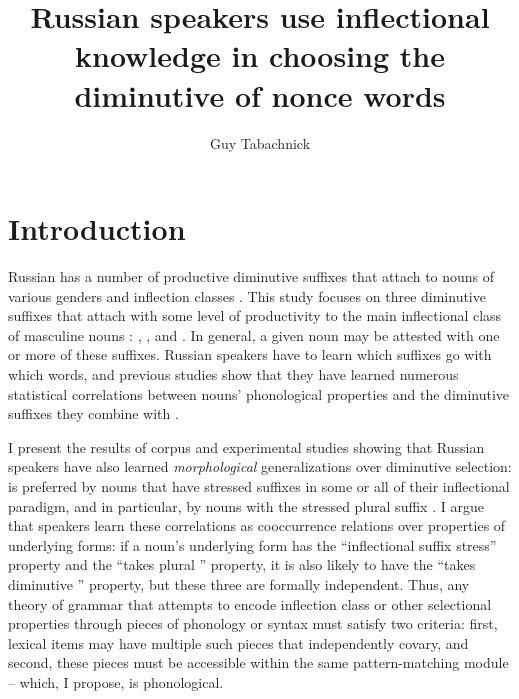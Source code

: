\documentclass[output=paper,colorlinks,citecolor=brown
]{langscibook}
\author{Guy Tabachnick\orcid{0009-0006-5705-516X}\affiliation{Masaryk University}}
\title[Russian speakers use inflectional knowledge in choosing nonce words]{Russian speakers use inflectional knowledge in choosing the diminutive of nonce words}
\begin{document}
\maketitle

% 


\section{Introduction}\label{sec:intro}

Russian has a number of productive diminutive suffixes that attach to nouns of various genders and inflection classes \citep[cf.][]{Steriopolo2008}. %
This study focuses on three diminutive suffixes that attach with some level of productivity to the main inflectional class of masculine nouns \citep[class I according to][]{Corbett1982}: \ok, \ik, and \chik. In general, a given noun may be attested with one or more of these suffixes. Russian speakers have to learn which suffixes go with which words, and previous studies show that they have learned numerous statistical correlations between nouns' phonological properties and the diminutive suffixes they combine with \citep{Gouskova.etal2015, Magomedova2017}.

I present the results of corpus and experimental studies showing that Russian speakers have also learned \emph{morphological} generalizations over diminutive selection: \ok{} is preferred by nouns that have stressed suffixes in some or all of their inflectional paradigm, and in particular, by nouns with the stressed plural suffix \pla{}. I argue that speakers learn these correlations as cooccurrence relations over properties of underlying forms: if a noun's underlying form has the ``inflectional suffix stress'' property and the ``takes plural \pla'' property, it is also likely to have the ``takes diminutive \ok'' property, but these three are formally independent. Thus, any theory of grammar that attempts to encode inflection class or other selectional properties through pieces of phonology or syntax must satisfy two criteria: first, lexical items may have multiple such pieces that independently covary, and second, these pieces must be accessible within the same %
pattern-matching module -- which, I propose, is phonological. %
\end{document}
